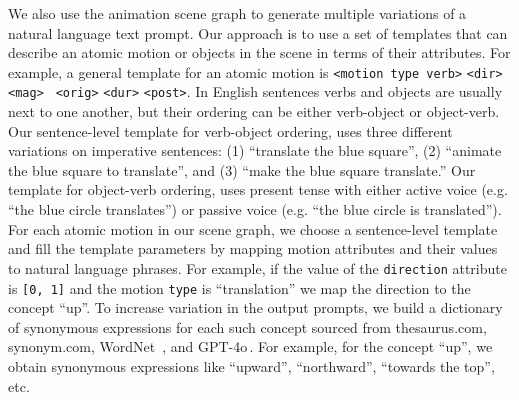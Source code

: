 

We also use the animation scene graph to generate multiple variations
of a natural language text prompt.  Our approach is to use a set of
templates that can describe an atomic motion or objects in
the scene in terms of their attributes.
%
For example, a general template for an atomic motion is {\tt <motion
  type verb>} {\tt <agent object>} {\tt <dir>} {\tt <mag>} {\tt
  <orig>} {\tt <dur>} {\tt <post>}.
%
In English sentences verbs and objects are usually next to one
another, but their ordering can be either verb-object or object-verb.
%
Our sentence-level template for verb-object ordering, uses three
different variations on imperative sentences: (1) ``translate the blue
square'', (2) ``animate the blue square to translate'', and (3) ``make
the blue square translate.''
%
Our template for object-verb ordering, uses present tense with either
active voice (e.g. ``the blue circle translates'') or passive voice
(e.g. ``the blue circle is translated'').
%
For each atomic motion in our scene graph, we choose a sentence-level template
and fill the template parameters by mapping motion attributes
and their values to natural language phrases. 
%
For example, if the value of the \texttt{direction} attribute is
\texttt{[0, 1]} and the motion {\tt type} is ``translation'' we map
the direction to the concept ``up''.
To increase variation in the output prompts, we build a dictionary of
synonymous expressions for each such concept sourced from
thesaurus.com, synonym.com, WordNet~\cite{miller1994wordnet}, and
GPT-4o\,\cite{hurst2024gpt}.  For example, for the concept
``up'', we obtain synonymous expressions like ``upward'',
``northward'', ``towards the top'', etc.
%
%
